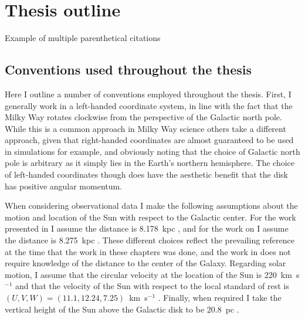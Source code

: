 \section{Thesis outline}

Example of multiple parenthetical citations 



\subsection{Conventions used throughout the thesis}

Here I outline a number of conventions employed throughout the thesis. First, I generally work in a left-handed coordinate system, in line with the fact that the Milky Way rotates clockwise from the perspective of the Galactic north pole. While this is a common approach in Milky Way science others take a different approach, given that right-handed coordinates are almost guaranteed to be used in simulations for example, and obviously noting that the choice of Galactic north pole is arbitrary as it simply lies in the Earth's northern hemisphere. The choice of left-handed coordinates though does have the aesthetic benefit that the disk has positive angular momentum.

When considering observational data I make the following assumptions about the motion and location of the Sun with respect to the Galactic center. For the work presented in  I assume the distance is 8.178~kpc \parencite{gravity19}, and for the work on  I assume the distance is 8.275~kpc \parencite{gravity21}. These different choices reflect the prevailing reference at the time that the work in these chapters was done, and the work in  does not require knowledge of the distance to the center of the Galaxy. Regarding solar motion, I assume that the circular velocity at the location of the Sun is 220~km~s$^{-1}$ and that the velocity of the Sun with respect to the local standard of rest is $(U,V,W) = (11.1,12.24,7.25)$~km~s$^{-1}$ \parencite{schoenrich10}. Finally, when required I take the vertical height of the Sun above the Galactic disk to be 20.8~pc \parencite{bennett19}.

